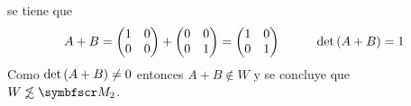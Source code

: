 \begin{enumerate}[label=\listAlph]
\[            \]
            se tiene que
            \[
                A + B 
                =
                \begin{pmatrix}
                    1 & 0 \\
                    0 & 0
                \end{pmatrix}
                +
                \begin{pmatrix}
                    0 & 0 \\
                    0 & 1
                \end{pmatrix}
                =
                \begin{pmatrix}
                    1 & 0 \\
                    0 & 1
                \end{pmatrix}
                \hspace{1cm}
                \text{det} \left( A + B \right) = 1
            \]
            Como \(\text{det} \left( A + B \right) \neq 0\) entonces \(A + B \not \in W\) y se concluye que \(W \not\lesssim \fm_2\).
    \end{enumerate}
